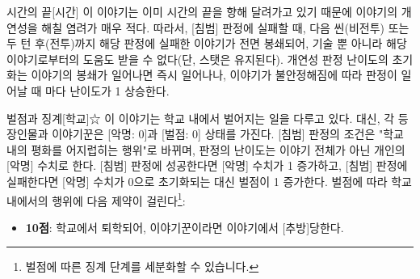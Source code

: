 \documentclass{report}
\begin{document}
	\begin{story}{시간의 끝}{[시간]}
		이 이야기는 이미 시간의 끝을 향해 달려가고 있기 때문에 이야기의 개연성을 해칠 염려가 매우 적다. 따라서, [침범] 판정에 실패할 때, 다음 씬(비전투) 또는 두 턴 후(전투)까지 해당 판정에 실패한 이야기가 전면 봉쇄되어, 기술 뿐 아니라 해당 이야기로부터의 도움도 받을 수 없다(단, 스탯은 유지된다). 개연성 판정 난이도의 초기화는 이야기의 봉쇄가 일어나면 즉시 일어나나, 이야기가 불안정해짐에 따라 판정이 일어날 때 마다 난이도가 1 상승한다.
	\end{story}
	
	\begin{story}{벌점과 징계}{[학교]☆}
		이 이야기는 학교 내에서 벌어지는 일을 다루고 있다. 대신, 각 등장인물과 이야기꾼은 [악명: 0]과 [벌점: 0] 상태를 가진다. [침범] 판정의 조건은 "학교 내의 평화를 어지럽히는 행위"로 바뀌며, 판정의 난이도는 이야기 전체가 아닌 개인의 [악명] 수치로 한다. [침범] 판정에 성공한다면 [악명] 수치가 1 증가하고, [침범] 판정에 실패한다면 [악명] 수치가 0으로 초기화되는 대신 벌점이 1 증가한다. 벌점에 따라 학교 내에서의 행위에 다음 제약이 걸린다\footnote{벌점에 따른 징계 단계를 세분화할 수 있습니다.}:
		\begin{itemize}
			\item \textbf{10점}: 학교에서 퇴학되어, 이야기꾼이라면 이야기에서 [추방]당한다.
		\end{itemize}
	\end{story}
\end{document}
